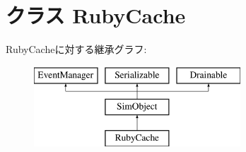 \hypertarget{classCache_1_1RubyCache}{
\section{クラス RubyCache}
\label{classCache_1_1RubyCache}
}
RubyCacheに対する継承グラフ:\begin{figure}[H]
\begin{center}
\leavevmode
\includegraphics[height=3cm]{classCache_1_1RubyCache}
\end{center}
\end{figure}
